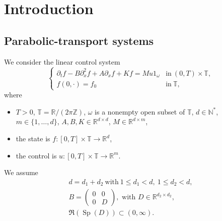 \documentclass[11pt]{article}
\theoremstyle{plain}
\theoremstyle{definition}
\theoremstyle{remark}
\DeclareMathOperator{\Sp}{Sp}
\newcommand{\set}{\mathbb}
\newcommand{\N}{\set{N}}
\newcommand{\Z}{\set{Z}}
\newcommand{\R}{} %
\renewcommand{\R}{\set{R}}
\newcommand{\T}{\set{T}}
\begin{document}
\section{Introduction}
\subsection{Parabolic-transport systems}
We consider the linear control system
\begin{equation}
\label{Syst}\tag{Sys}
\begin{cases}
\partial_t f- B \partial_{x}^2 f + A \partial_x f + K f = M u 1_{\omega} &\text{in}\ (0,T)\times \T,\\
f(0,\cdot)=f_0& \text{in}\ \T,
\end{cases}
\end{equation}
where
\begin{itemize}
\item $T >0$, $\T = \R/(2\pi \Z)$, $\omega$ is a nonempty open subset of $\T$, $d \in \N^{*}$, $m\in\{1,\dots,d\}$, $A, B, K \in \R^{d \times d}$, $M\in\R^{d\times m}$,
\item the state is $f\colon [0,T]\times\T \to \R^d$,
\item the control is $u\colon [0,T]\times\T \to \R^m$.
\end{itemize}
We assume
\begin{gather}
d=d_1 + d_2\ \text{with}\ 1 \leq d_1 < d,\ 1 \leq d_2 < d,\label{dd1d2}\tag{H.1}\\
B = \begin{pmatrix}0&0\\0&D\end{pmatrix},\text{ with } D\in \set R^{d_2\times d_2},\label{h:B}\tag{H.2}\\
\Re(\Sp(D)) \subset (0,\infty). \label{h:D}\tag{H.3}
\end{gather}
\end{document}
